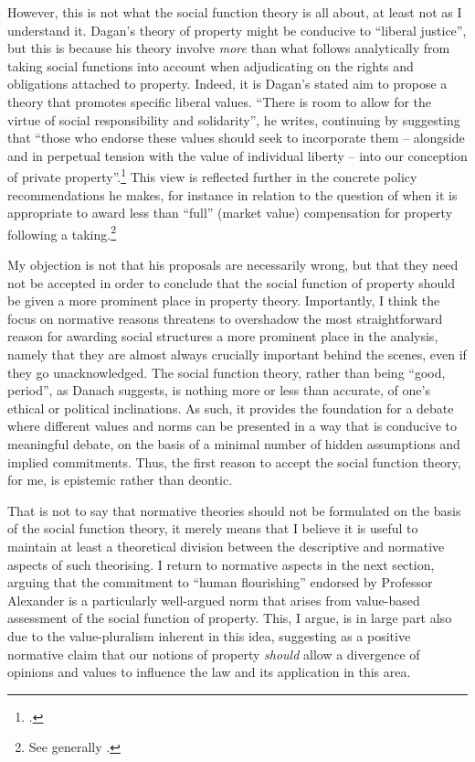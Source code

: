 However, this is not what the social function theory is all about, at least not as I understand it. Dagan's theory of property might be conducive to ``liberal justice'', but this is because his theory involve {\it more} than what follows analytically from taking social functions into account when adjudicating on the rights and obligations attached to property. Indeed, it is Dagan's stated aim to propose a theory that promotes specific liberal values. ``There is room to allow for the virtue of social responsibility and solidarity'', he writes, continuing by suggesting that ``those who endorse these values should seek to incorporate them -- alongside and in perpetual tension with the value of individual liberty -- into our conception of private property''.\footcite[802]{dagan99} This view is reflected further in the concrete policy recommendations he makes, for instance in relation to the question of when it is appropriate to award less than ``full'' (market value) compensation for property following a taking.\footnote{See generally \cite{dagan14b}.}

My objection is not that his proposals are necessarily wrong, but that they need not be accepted in order to conclude that the social function of property should be given a more prominent place in property theory. Importantly, I think the focus on normative reasons threatens to overshadow the most straightforward reason for awarding social structures a more prominent place in the analysis, namely that they are almost always crucially important behind the scenes, even if they go unacknowledged. The social function theory, rather than being ``good, period'', as Danach suggests, is nothing more or less than accurate,  of one's ethical or political inclinations. As such, it provides the foundation for a debate where different values and norms can be presented in a way that is conducive to meaningful debate, on the basis of a minimal number of hidden assumptions and implied commitments. Thus, the first reason to accept the social function theory, for me, is epistemic rather than deontic.

That is not to say that normative theories should not be formulated on the basis of the social function theory, it merely means that I believe it is useful to maintain at least a theoretical division between the descriptive and normative aspects of such theorising. I return to normative aspects in the next section, arguing that the commitment to ``human flourishing'' endorsed by Professor Alexander is a particularly well-argued norm that arises from value-based assessment of the social function of property. This, I argue, is in large part also due to the value-pluralism inherent in this idea, suggesting as a positive normative claim that our notions of property {\it should} allow a divergence of opinions and values to influence the law and its application in this area.

